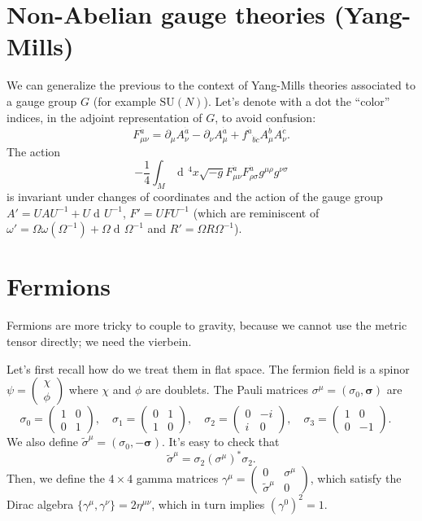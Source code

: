 \documentclass[a4paper,12pt]{book}
\newcommand{\dd}{\mathop{\mathrm{d}\!}{}}
\theoremstyle{definition}
\theoremstyle{remark}
\begin{document}
\section{Non-Abelian gauge theories (Yang-Mills)}
We can generalize the previous to the context of Yang-Mills theories associated to a gauge group $G$ (for example $\text{SU}(N)$). Let's denote with a dot the ``color'' indices, in the adjoint representation of $G$, to avoid confusion:
\[F^{\dot a}_{\mu\nu}=\partial_\mu A^{\dot a}_\nu-\partial_\nu A^{\dot a}_\mu+f^{\dot a}{}_{\dot b\dot c}A^{\dot b}_\mu A^{\dot c}_\nu.\]
The action
\[-\frac{1}{4}\int_M\dd^4x\sqrt{-g}F^{\dot a}_{\mu\nu}F^{\dot a}_{\rho\sigma}g^{\mu\rho}g^{\nu\sigma}\]
is invariant under changes of coordinates and the action of the gauge group $A'=UAU^{-1}+U\dd U^{-1}$, $F'=UFU^{-1}$ (which are reminiscent of $\omega'=\Omega\omega(\Omega^{-1})+\Omega\dd\Omega^{-1}$ and $R'=\Omega R\Omega^{-1}$).

\section{Fermions}
Fermions are more tricky to couple to gravity, because we cannot use the metric tensor directly; we need the vierbein.

Let's first recall how do we treat them in flat space. The fermion field is a spinor $\psi=\begin{pmatrix}\chi\\ \phi\end{pmatrix}$ where $\chi$ and $\phi$ are doublets. The Pauli matrices $\sigma^\mu=(\sigma_0,\boldsymbol\sigma)$ are
\[
\sigma_0=\begin{pmatrix}1& 0\\ 0& 1\end{pmatrix},\quad
\sigma_1=\begin{pmatrix}0& 1\\ 1& 0\end{pmatrix},\quad
\sigma_2=\begin{pmatrix}0& -i\\ i& 0\end{pmatrix},\quad
\sigma_3=\begin{pmatrix}1& 0\\ 0& -1\end{pmatrix}.\quad
\]
We also define $\tilde\sigma^\mu=(\sigma_0,-\boldsymbol\sigma)$. It's easy to check that
\begin{equation}
\tilde\sigma^\mu=\sigma_2(\sigma^\mu)^*\sigma_2.
\label{eqn:identitysigmatilde}
\end{equation} Then, we define the $4\times4$ gamma matrices $\gamma^\mu=\begin{pmatrix}0& \sigma^\mu\\ \tilde\sigma^\mu& 0\end{pmatrix}$, which satisfy the Dirac algebra $\{\gamma^\mu,\gamma^\nu\}=2\eta^{\mu\nu}$, which in turn implies $(\gamma^0)^2=1$.
\end{document}

